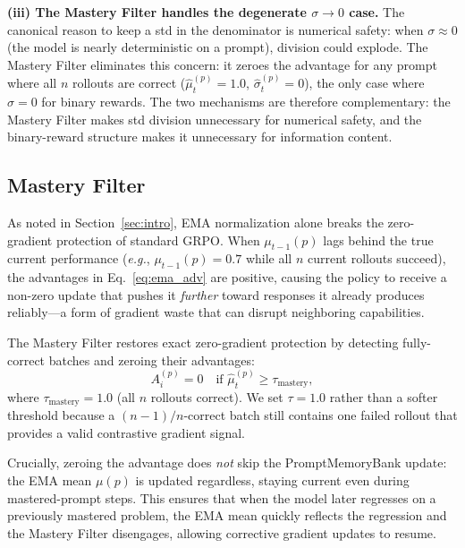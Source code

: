 \documentclass[11pt]{article}
\newcommand{\eg}{\textit{e.g.}}
\theoremstyle{definition}
\begin{document}
\textbf{(iii) The Mastery Filter handles the degenerate $\sigma \to 0$ case.}
The canonical reason to keep a std in the denominator is numerical safety:
when $\sigma \approx 0$ (the model is nearly deterministic on a prompt),
division could explode.
The Mastery Filter eliminates this concern: it zeroes the advantage for
any prompt where all $n$ rollouts are correct ($\hat{\mu}_t^{(p)} = 1.0$,
$\hat{\sigma}_t^{(p)} = 0$), the only case where $\sigma = 0$ for binary
rewards.
The two mechanisms are therefore complementary: the Mastery Filter makes
std division unnecessary for numerical safety, and the binary-reward
structure makes it unnecessary for information content.

\subsection{Mastery Filter}
\label{sec:mastery}

As noted in Section~\ref{sec:intro}, EMA normalization alone breaks the
zero-gradient protection of standard GRPO.
When $\mu_{t-1}(p)$ lags behind the true current performance (\eg,
$\mu_{t-1}(p) = 0.7$ while all $n$ current rollouts succeed), the advantages
in Eq.~\eqref{eq:ema_adv} are positive, causing the policy to receive a
non-zero update that pushes it \emph{further} toward responses it already
produces reliably—a form of gradient waste that can disrupt neighboring
capabilities.

The Mastery Filter restores exact zero-gradient protection by detecting
fully-correct batches and zeroing their advantages:
\begin{equation}
  A_i^{(p)} = 0 \quad \text{if } \hat{\mu}_t^{(p)} \geq \tau_{\mathrm{mastery}},
  \label{eq:mastery}
\end{equation}
where $\tau_{\mathrm{mastery}} = 1.0$ (all $n$ rollouts correct).
We set $\tau = 1.0$ rather than a softer threshold because a $(n-1)/n$-correct
batch still contains one failed rollout that provides a valid contrastive
gradient signal.

Crucially, zeroing the advantage does \emph{not} skip the PromptMemoryBank
update: the EMA mean $\mu(p)$ is updated regardless, staying current even
during mastered-prompt steps.
This ensures that when the model later regresses on a previously mastered
problem, the EMA mean quickly reflects the regression and the Mastery
Filter disengages, allowing corrective gradient updates to resume.
\end{document}
